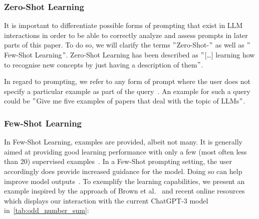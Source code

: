 \subsubsection{Zero-Shot Learning} %
It is important to differentiate possible forms of prompting that exist in LLM interactions in order
to be able to correctly analyze and assess prompts in later parts of this paper.
To do so, we will clarify the terms \("\)Zero-Shot-\("\) as well as \("\)Few-Shot Learning\("\).
Zero-Shot Learning has been described as \("\)[\ldots] learning how to recognise
new concepts by just having a description of them\("\)\cite[p. 1]{feris_embarrassingly_2015}.

In regard to prompting, we refer to any form of prompt where the user does not specify
a particular example as part of the query~\cite[p. 1]{dang_how_2022}.
An example for such a query could be \("\)Give me five examples of papers that deal with the topic
of LLMs\("\).

\subsubsection{Few-Shot Learning}
In Few-Shot Learning, examples are provided, albeit not many.
It is generally aimed at providing good learning performance with only a few (most often less than 20)
supervised examples~\cite[p. 1]{samuel_offline_2022}. %
In a Few-Shot prompting setting, the user accordingly does provide increased guidance for the model.
Doing so can help improve model outputs~\cite[p. 1]{dang_how_2022}.
To exemplify the learning capabilities, we present an example inspired by the approach of Brown et al\(.\)~\cite{brown_language_2020}
and recent online resources~\cite{dairai_few-shot_2023} which displays our interaction with
the current ChatGPT-3 model in~\ref{tab:odd_number_sum}:

